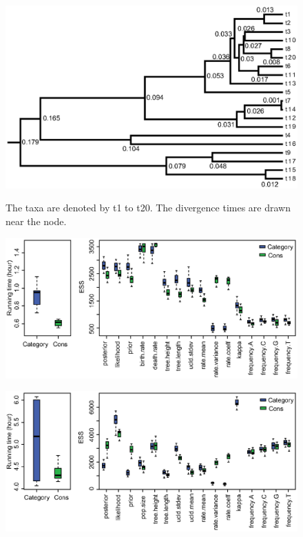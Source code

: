\documentclass{bmcart}
\begin{document}
\begin{backmatter}
\begin{figure}[h!]
\includegraphics[width=12cm]{Fig16-simulateddatatree.eps}\\
\caption{
             The taxa are denoted by t1 to t20. The divergence times are drawn near the node.}
\label{simulateddatatree}
\end{figure}

\begin{figure}[h!]
\includegraphics[width=12cm]{Fig17-AnolisTimeEss.eps}\\
\caption{}
\label{anolistimeess}
\end{figure}

\begin{figure}[h!]
\includegraphics[width=12cm]{Fig18-RSV2TimeEss.eps}\\
\caption{}
\label{rsv2timeess}
\end{figure}


\end{backmatter}
\end{document}
